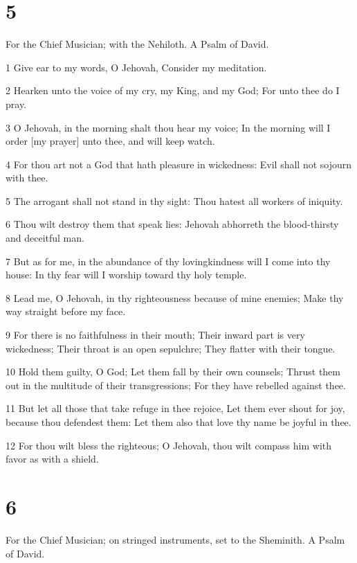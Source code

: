 \chapter{5}

\par For the Chief Musician; with the Nehiloth. A Psalm of David.

\par 1 Give ear to my words, O Jehovah, Consider my meditation.
\par 2 Hearken unto the voice of my cry, my King, and my God; For unto thee do I pray.
\par 3 O Jehovah, in the morning shalt thou hear my voice; In the morning will I order [my prayer] unto thee, and will keep watch.
\par 4 For thou art not a God that hath pleasure in wickedness: Evil shall not sojourn with thee.
\par 5 The arrogant shall not stand in thy sight: Thou hatest all workers of iniquity.
\par 6 Thou wilt destroy them that speak lies: Jehovah abhorreth the blood-thirsty and deceitful man.
\par 7 But as for me, in the abundance of thy lovingkindness will I come into thy house: In thy fear will I worship toward thy holy temple.
\par 8 Lead me, O Jehovah, in thy righteousness because of mine enemies; Make thy way straight before my face.
\par 9 For there is no faithfulness in their mouth; Their inward part is very wickedness; Their throat is an open sepulchre; They flatter with their tongue.
\par 10 Hold them guilty, O God; Let them fall by their own counsels; Thrust them out in the multitude of their transgressions; For they have rebelled against thee.
\par 11 But let all those that take refuge in thee rejoice, Let them ever shout for joy, because thou defendest them: Let them also that love thy name be joyful in thee.
\par 12 For thou wilt bless the righteous; O Jehovah, thou wilt compass him with favor as with a shield.

\chapter{6}

\par For the Chief Musician; on stringed instruments, set to the Sheminith. A Psalm of David.

